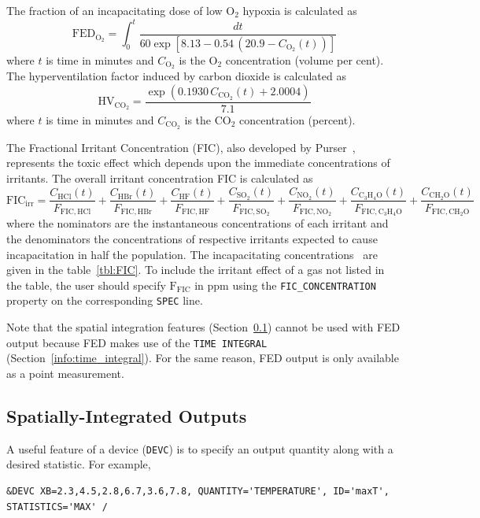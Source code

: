 \documentclass[11pt]{book}
\newcommand{\ct}{\tt\small}
\newcommand{\be}{\begin{equation}}
\newcommand{\ee}{\end{equation}}
\begin{document}
The fraction of an incapacitating dose of low O${}_2$ hypoxia is calculated as
\be
\mathrm{FED}_\mathrm{O_2} =  \int_0^t \frac{dt}{60 \exp \left [ 8.13 - 0.54 \, (20.9 - C_\mathrm{O_2}(t)) \right ] }
\ee
where $t$ is time in minutes and $C_\mathrm{O_2}$ is the O${}_2$ concentration (volume per cent).
The hyperventilation factor induced by carbon dioxide is calculated as
\be
\mathrm{HV}_\mathrm{CO_2} = \frac{ \exp( 0.1930 \, C_\mathrm{CO_2}(t) +  2.0004 ) }{7.1} \label{co2hyp}
\ee
where $t$ is time in minutes and $C_\mathrm{CO_2}$ is the CO${}_2$ concentration (percent).

The Fractional Irritant Concentration (FIC), also developed by Purser~\cite{SFPE:Purser}, represents the toxic effect which
depends upon the immediate concentrations of irritants. The overall irritant concentration FIC is calculated as
\be
\mathrm{FIC}_\mathrm{irr} =
    \frac{C_\mathrm{HCl}(t)}    {F_\mathrm{FIC,HCl}} +
    \frac{C_\mathrm{HBr}(t)}    {F_\mathrm{FIC,HBr}} +
    \frac{C_\mathrm{HF}(t)}     {F_\mathrm{FIC,HF}} +
    \frac{C_\mathrm{SO_2}(t)}   {F_\mathrm{FIC,SO_2}} +
    \frac{C_\mathrm{NO_2}(t)}   {F_\mathrm{FIC,NO_2}} +
    \frac{C_\mathrm{C_3H_4O}(t)}{F_\mathrm{FIC,C_3H_4O}} +
    \frac{C_\mathrm{CH_2O}(t)}  {F_\mathrm{FIC,CH_2O}}
\ee
where the nominators are the instantaneous concentrations of each irritant and the denominators the concentrations of respective irritants
expected to cause incapacitation in half the population. The incapacitating concentrations~\cite{SFPE:Purser} are given in the table~\ref{tbl:FIC}.
To include the irritant effect of a gas not listed in the table, the user should specify $\mathrm{F_{FIC}}$ in ppm using the {\ct FIC\_CONCENTRATION}
property on the corresponding {\ct SPEC} line.

Note that the spatial integration features (Section~\ref{info:statistics}) cannot be used with FED output because FED makes
use of the {\ct TIME INTEGRAL} (Section~\ref{info:time_integral}). For the same reason, FED output is only available as a point
measurement.

\subsection{Spatially-Integrated Outputs}
\label{info:statistics}

A useful feature of a device ({\ct DEVC}) is to specify an output quantity along with a desired statistic. For example,

\footnotesize
\begin{verbatim}
&DEVC XB=2.3,4.5,2.8,6.7,3.6,7.8, QUANTITY='TEMPERATURE', ID='maxT', STATISTICS='MAX' /
\end{verbatim}
\normalsize
\end{document}
